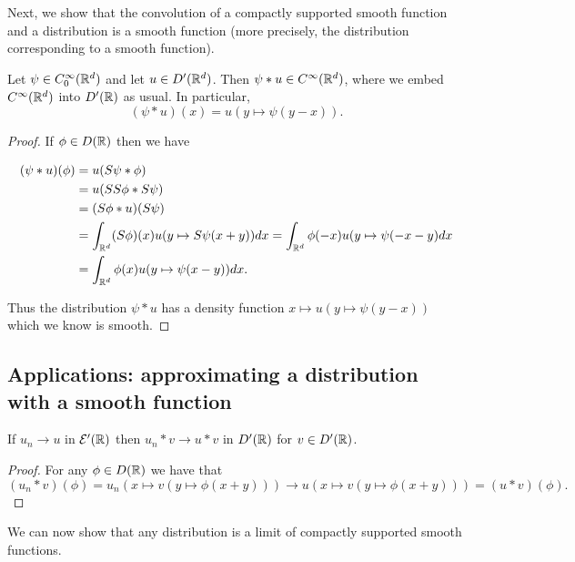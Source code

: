 \documentclass[twoside, a4paper, 10pt]{amsart}
\begin{document}
Next, we show that the convolution of a compactly supported smooth function and a distribution is a smooth function (more precisely, the distribution corresponding to a smooth function).

\begin{thm} \label{thm: convolution of function with distribution is function}  Let $\psi \in C_0^{\infty}(\mathbb{R}^d)$ and let $u \in D'(\mathbb{R}^d)$. Then $\psi * u \in C^{\infty}(\mathbb{R}^d)$, where we embed $C^{\infty}(\mathbb{R}^d)$ into $D'(\mathbb{R})$ as usual. In particular, $$(\psi * u) (x) = u(y \mapsto \psi(y-x)) .$$

\end{thm}

\begin{proof} If $\phi \in D(\mathbb{R})$ then we have 

\begin{align*} (\psi * u)(\phi) &= u(S\psi * \phi) \\ &= u(SS\phi * S\psi) \\ &= (S\phi * u)(S\psi) \\ &= \int_{\mathbb{R}^d} (S\phi) (x) u(y \mapsto S\psi(x+y)) dx = \int_{\mathbb{R}^d} \phi(-x) u(y \mapsto \psi(-x-y) dx \\ &= \int_{\mathbb{R}^d} \phi(x) u(y \mapsto \psi(x-y)) dx. \end{align*}

Thus the distribution $\psi * u$ has a density function $x \mapsto u(y \mapsto \psi(y-x))$ which we know is smooth.

\end{proof}

\subsection{Applications: approximating a distribution with a smooth function}

\begin{lemma}\label{lemma: convolution continuous} If $u_n \to u$ in $\mathcal{E}'(\mathbb{R})$ then $u_n * v \to u * v$ in $D'(\mathbb{R})$ for $v \in D'(\mathbb{R})$.

\end{lemma}

\begin{proof} For any $\phi \in D(\mathbb{R})$ we have that $$(u_n * v)(\phi) = u_n(x \mapsto v(y \mapsto \phi(x+y))) \to u(x \mapsto v(y \mapsto \phi(x+y))) = (u*v)(\phi).$$

\end{proof}

We can now show that any distribution is a limit of compactly supported smooth functions.
\end{document}

